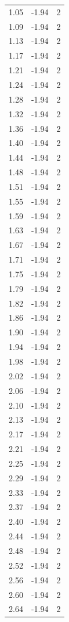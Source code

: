 \begin{longtable}{lrr}
  1.05 & -1.94 & 2 \\
  1.09 & -1.94 & 2 \\
  1.13 & -1.94 & 2 \\
  1.17 & -1.94 & 2 \\
  1.21 & -1.94 & 2 \\
  1.24 & -1.94 & 2 \\
  1.28 & -1.94 & 2 \\
  1.32 & -1.94 & 2 \\
  1.36 & -1.94 & 2 \\
  1.40 & -1.94 & 2 \\
  1.44 & -1.94 & 2 \\
  1.48 & -1.94 & 2 \\
  1.51 & -1.94 & 2 \\
  1.55 & -1.94 & 2 \\
  1.59 & -1.94 & 2 \\
  1.63 & -1.94 & 2 \\
  1.67 & -1.94 & 2 \\
  1.71 & -1.94 & 2 \\
  1.75 & -1.94 & 2 \\
  1.79 & -1.94 & 2 \\
  1.82 & -1.94 & 2 \\
  1.86 & -1.94 & 2 \\
  1.90 & -1.94 & 2 \\
  1.94 & -1.94 & 2 \\
  1.98 & -1.94 & 2 \\
  2.02 & -1.94 & 2 \\
  2.06 & -1.94 & 2 \\
  2.10 & -1.94 & 2 \\
  2.13 & -1.94 & 2 \\
  2.17 & -1.94 & 2 \\
  2.21 & -1.94 & 2 \\
  2.25 & -1.94 & 2 \\
  2.29 & -1.94 & 2 \\
  2.33 & -1.94 & 2 \\
  2.37 & -1.94 & 2 \\
  2.40 & -1.94 & 2 \\
  2.44 & -1.94 & 2 \\
  2.48 & -1.94 & 2 \\
  2.52 & -1.94 & 2 \\
  2.56 & -1.94 & 2 \\
  2.60 & -1.94 & 2 \\
  2.64 & -1.94 & 2 \\

\end{longtable}
